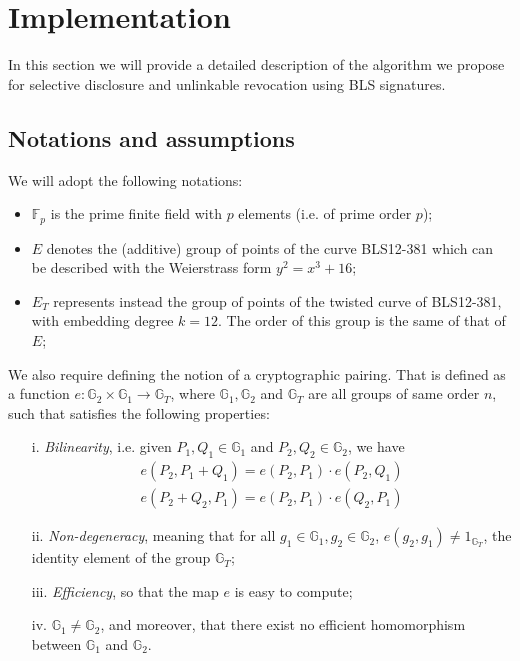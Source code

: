 \section{Implementation}

In this section we will provide a detailed description of the
algorithm we propose for selective disclosure and unlinkable
revocation using BLS signatures.

\subsection{Notations and assumptions}

We will adopt the following notations:
\begin{itemize}

\item $\mathbb{F}_p$ is the prime finite field with $p$ elements
  (i.e. of prime order $p$);

\item $E$ denotes the (additive) group of points of the curve
  BLS12-381 \cite{bls381-12} which can be described with the
  Weierstrass form $y^2=x^3 + 16$;

\item $E_T$ represents instead the group of points of the twisted
  curve of BLS12-381, with embedding degree $k=12$. The order of
  this group is the same of that of $E$;

\end{itemize}

We also require defining the notion of a cryptographic
pairing. That is defined as a function $e:
\mathbb{G}_2\times\mathbb{G}_1\to \mathbb{G}_T$, where
$\mathbb{G}_1,\mathbb{G}_2$ and $\mathbb{G}_T$ are all groups of same
order $n$, such that satisfies the following properties:

\begin{itemize}

\item [i.] \emph{Bilinearity}, i.e. given $P_1,Q_1\in\mathbb{G}_1$
  and $P_2,Q_2\in\mathbb{G}_2$, we have
  \begin{align*}
    e(P_2,P_1+Q_1) = e(P_2,P_1)\cdot e(P_2,Q_1)   \\
    e(P_2+Q_2,P_1) = e(P_2,P_1)\cdot e(Q_2,P_1)
  \end{align*}

\item[ii.] \emph{Non-degeneracy}, meaning that for all
  $g_1\in\mathbb{G}_1, g_2\in\mathbb{G}_2$, $e(g_2,g_1)\ne
  1_{\mathbb{G}_T}$, the identity element of the group
  $\mathbb{G}_T$;

\item[iii.] \emph{ Efficiency}, so that the map $e$ is easy to
  compute;

\item[iv. ] $\mathbb{G}_1\ne \mathbb{G}_2$, and moreover, that
  there exist no efficient homomorphism between $\mathbb{G}_1$ and
  $\mathbb{G}_2$.

\end{itemize}


